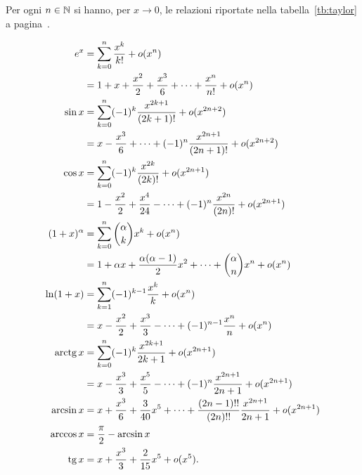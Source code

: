 \begin{theorem}
\label{th:sviluppi_taylor}
\mymark{***}
Per ogni $n\in {\mathbb N}$ si hanno, per $x\to 0$,
le relazioni riportate nella tabella~\ref{tb:taylor}
a pagina~\pageref{tb:taylor}.
\end{theorem}
\begin{table}
\begin{align*}
e^x &= \sum_{k=0}^n \frac{x^k}{k!} + o(x^n) \\
  &= 1 + x + \frac{x^2}{2} + \frac {x^3}{6} + \dots + \frac{x^n}{n!} + o(x^n) \\
\sin x &= \sum_{k=0}^n (-1)^k\frac{x^{2k+1}}{(2k+1)!} + o(x^{2n+2}) \\
 &= x - \frac{x^3}{6} + \dots + (-1)^{n} \frac{x^{2n+1}}{(2n+1)!}  + o(x^{2n+2})\\
 \cos x &= \sum_{k=0}^n (-1)^k \frac{x^{2k}}{(2k)!} + o(x^{2n+1}) \\
   &= 1 - \frac{x^2}{2} + \frac{x^4}{24} - \dots + (-1)^n\frac{x^{2n}}{(2n)!} + o(x^{2n+1})\\
 (1+x)^\alpha &= \sum_{k=0}^n {\alpha \choose k} x^k + o(x^n)\\
    &= 1 + \alpha x + \frac{\alpha (\alpha-1)}{2} x^2 + \dots + {\alpha \choose n} x^n + o(x^n) \\
  \ln (1+x) &= \sum_{k=1}^n (-1)^{k-1} \frac{x^k}{k} + o(x^n) \\
         &= x - \frac{x^2}{2} + \frac{x^3}{3} - \dots + (-1)^{n-1}\frac{x^n}{n} + o(x^n) \\
  \operatorname{arctg} x &= \sum_{k=0}^n (-1)^k \frac{x^{2k+1}}{2k+1} + o(x^{2n+1})\\
    &= x - \frac{x^3}{3} + \frac{x^5}{5} - \dots + (-1)^n \frac{x^{2n+1}}{2n +1} + o(x^{2n+1})\\
  \arcsin x &= x + \frac{x^3}{6} + \frac{3}{40} x^5 + \dots + \frac{(2n-1)!!}{(2n)!!} \frac{x^{2n+1}}{2n+1} + o(x^{2n+1}) \\
  \arccos x &= \frac \pi 2 - \arcsin x\\
  \operatorname{tg} x &= x + \frac{x^3}{3} + \frac{2}{15} x^5 + o(x^5).
\end{align*}
\caption{sviluppi di Taylor, per $x\to 0$, di alcune funzioni elementari.
%
%
Si veda il teorema~\ref{th:sviluppi_taylor}.}
\label{tb:taylor}%
\end{table}
%
